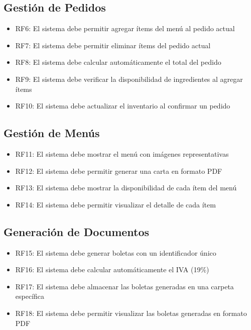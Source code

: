 \documentclass[12pt,letterpaper]{article}
\begin{document}
\subsection{Gestión de Pedidos}
\begin{itemize}
    \item RF6: El sistema debe permitir agregar ítems del menú al pedido actual
    \item RF7: El sistema debe permitir eliminar ítems del pedido actual
    \item RF8: El sistema debe calcular automáticamente el total del pedido
    \item RF9: El sistema debe verificar la disponibilidad de ingredientes al agregar ítems
    \item RF10: El sistema debe actualizar el inventario al confirmar un pedido
\end{itemize}

\subsection{Gestión de Menús}
\begin{itemize}
    \item RF11: El sistema debe mostrar el menú con imágenes representativas
    \item RF12: El sistema debe permitir generar una carta en formato PDF
    \item RF13: El sistema debe mostrar la disponibilidad de cada ítem del menú
    \item RF14: El sistema debe permitir visualizar el detalle de cada ítem
\end{itemize}

\subsection{Generación de Documentos}
\begin{itemize}
    \item RF15: El sistema debe generar boletas con un identificador único
    \item RF16: El sistema debe calcular automáticamente el IVA (19\%)
    \item RF17: El sistema debe almacenar las boletas generadas en una carpeta específica
    \item RF18: El sistema debe permitir visualizar las boletas generadas en formato PDF
\end{itemize}
\end{document}
